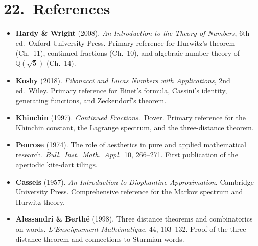 \section{22.\ References}\label{sec:gc-refs}

\begin{itemize}
\item
  \textbf{Hardy \& Wright} (2008). \emph{An Introduction to the Theory of Numbers}, 6th ed.\ Oxford University Press.
  \cite{hardy_wright}
  Primary reference for Hurwitz's theorem (Ch.~11),
  continued fractions (Ch.~10), and algebraic
  number theory of $\mathbb{Q}(\sqrt{5})$ (Ch.~14).

\item
  \textbf{Koshy} (2018). \emph{Fibonacci and Lucas Numbers with Applications}, 2nd ed.\ Wiley.
  \cite{koshy_fib_lucas}
  Primary reference for Binet's formula, Cassini's
  identity, generating functions, and Zeckendorf's
  theorem.

\item
  \textbf{Khinchin} (1997). \emph{Continued Fractions}.\ Dover.
  \cite{khinchin_continued_fractions}
  Primary reference for the Khinchin constant,
  the Lagrange spectrum, and the three-distance theorem.

\item
  \textbf{Penrose} (1974). The role of aesthetics in pure and applied mathematical research.
  \emph{Bull.\ Inst.\ Math.\ Appl.}\ 10, 266--271.
  \cite{penrose1974}
  First publication of the aperiodic kite-dart tilings.

\item
  \textbf{Cassels} (1957). \emph{An Introduction to Diophantine Approximation}.
  Cambridge University Press.
  \cite{cassels_diophantine}
  Comprehensive reference for the Markov spectrum
  and Hurwitz theory.

\item
  \textbf{Alessandri \& Berthé} (1998). Three distance theorems and combinatorics on words.
  \emph{L'Enseignement Mathématique}, 44, 103--132.
  \cite{alessandri1998}
  Proof of the three-distance theorem and connections
  to Sturmian words.
\end{itemize}


